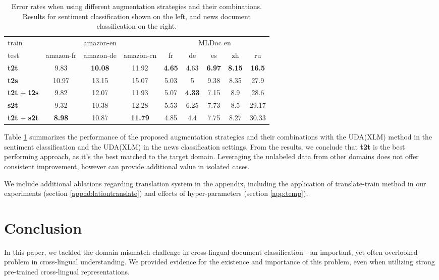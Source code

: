\documentclass{article} \usepackage{iclr2020_conference,times}
\begin{document}
\begin{table}[!ht]
\centering
    \begin{tabular}{l|ccc||ccccc}
    \toprule
    train  &          & amazon-en &          &       \multicolumn{5}{c}{MLDoc en}          \\
    test   & amazon-fr & amazon-de & amazon-cn & fr   & de   & es   & zh   & ru    \\
    \midrule
    \textbf{t2t}       & 9.83     & \textbf{10.08}    & 11.92    & \textbf{4.65} & 4.63 & \textbf{6.97} & \textbf{8.15} & \textbf{16.5}  \\
    \textbf{t2s}       & 10.97    & 13.15    & 15.07    & 5.03 & 5    & 9.38 & 8.35 & 27.9  \\
    \textbf{t2t} + \textbf{t2s} & 9.82     & 12.07    & 11.93    & 5.07 & \textbf{4.33} & 7.15 & 8.9  & 28.6  \\
    \midrule
    \textbf{s2t}       & 9.32     & 10.38    & 12.28    & 5.53 & 6.25 & 7.73 & 8.5  & 29.17 \\
    \textbf{t2t} + \textbf{s2t} & \textbf{8.98}     & 10.87    & \textbf{11.79}    & 4.85 & 4.4  & 7.75 & 8.27 & 30.33 \\
    \bottomrule
    \end{tabular}
    \caption{Error rates when using different augmentation strategies and their combinations. Results for sentiment classification shown on the left, and news document classification on the right.}
    \label{tab:aug}
\end{table}

Table \ref{tab:aug} summarizes the performance of the proposed augmentation strategies and their combinations with the UDA(XLM) method in the sentiment classification and the UDA(XLM) in the news classification settings.
From the results, we conclude that \textbf{t2t} is the best performing approach, as it's the best matched to the target domain. Leveraging the unlabeled data from other domains does not offer consistent improvement, however can provide additional value in isolated cases. 

We include additional ablations regarding translation system in the appendix, including the application of translate-train method in our experiments (section \ref{app:ablationtranslate}) and effects of hyper-parameters (section \ref{app:temp}). 
 \section{Conclusion}

In this paper, we tackled the domain mismatch challenge in cross-lingual document classification - an important, yet often overlooked problem in cross-lingual understanding.  We provided evidence for the existence and importance of this problem, even when utilizing strong pre-trained cross-lingual representations.
\end{document}
